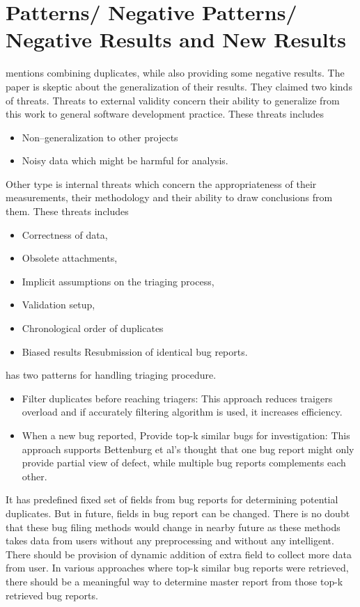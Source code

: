 \documentclass[]{sig-alternate-05-2015}
\begin{document}
\section{Patterns/ Negative Patterns/ Negative Results and New Results}

\cite{Bettenburg} mentions combining duplicates, while also providing some negative results. The paper is skeptic about the generalization of their results. They claimed two kinds of threats. Threats to external validity concern their ability to generalize from this work to general software development practice. These threats includes  
\begin{itemize}
\item Non--generalization to other projects
\item Noisy data which might be harmful for analysis.
\end{itemize}  

Other type is internal threats which concern the appropriateness of their measurements, their methodology and their ability to draw conclusions from them. These threats includes  
\begin{itemize}
\item Correctness of data,
\item Obsolete attachments,
\item Implicit assumptions on the triaging process,
\item Validation setup,
\item Chronological order of duplicates
\item Biased results  Resubmission of identical bug reports.
\end{itemize} 

\cite{Sun2011} has two patterns for handling triaging procedure.
\begin{itemize}
\item Filter duplicates before reaching triagers: This approach reduces traigers overload and if accurately filtering algorithm is used, it increases efficiency.
\item When a new bug reported, Provide top-k similar bugs for investigation: This approach supports Bettenburg et al’s thought that one bug report might only provide partial view of defect, while multiple bug reports complements each other.
\end{itemize} 
It has predefined fixed set of fields from bug reports for determining potential duplicates. But in future, fields in bug report can be changed. There is no doubt that these bug filing methods would change in nearby future as these methods takes data from users without any preprocessing and without any intelligent. There should be provision of dynamic addition of extra field to collect more data from user. In various approaches where top-k similar bug reports were retrieved, there should be a meaningful way to determine master report from those top-k retrieved bug reports.
\end{document}
